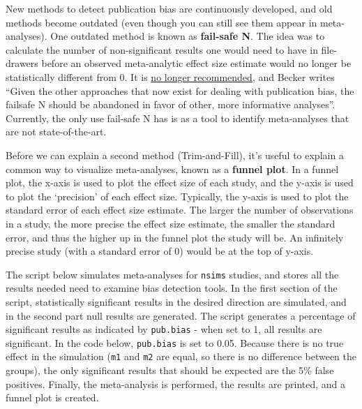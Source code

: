 \documentclass[
  oneside]{book}
\begin{document}
New methods to detect publication bias are continuously developed, and old methods become outdated (even though you can still see them appear in meta-analyses). One outdated method is known as \textbf{fail-safe N}. The idea was to calculate the number of non-significant results one would need to have in file-drawers before an observed meta-analytic effect size estimate would no longer be statistically different from 0. It is \href{https://handbook-5-1.cochrane.org/chapter_10/10_4_4_3_fail_safe_n.htm}{no longer recommended}, and Becker \citeyearpar{becker_failsafe_2005} writes ``Given the other approaches that now exist for dealing with publication bias, the failsafe N should be abandoned in favor of other, more informative analyses''. Currently, the only use fail-safe N has is as a tool to identify meta-analyses that are not state-of-the-art.

Before we can explain a second method (Trim-and-Fill), it's useful to explain a common way to visualize meta-analyses, known as a \textbf{funnel plot}. In a funnel plot, the x-axis is used to plot the effect size of each study, and the y-axis is used to plot the `precision' of each effect size. Typically, the y-axis is used to plot the standard error of each effect size estimate. The larger the number of observations in a study, the more precise the effect size estimate, the smaller the standard error, and thus the higher up in the funnel plot the study will be. An infinitely precise study (with a standard error of 0) would be at the top of y-axis.

The script below simulates meta-analyses for \texttt{nsims} studies, and stores all the results needed need to examine bias detection tools. In the first section of the script, statistically significant results in the desired direction are simulated, and in the second part null results are generated. The script generates a percentage of significant results as indicated by \texttt{pub.bias} - when set to 1, all results are significant. In the code below, \texttt{pub.bias} is set to 0.05. Because there is no true effect in the simulation (\texttt{m1} and \texttt{m2} are equal, so there is no difference between the groups), the only significant results that should be expected are the 5\% false positives. Finally, the meta-analysis is performed, the results are printed, and a funnel plot is created.
\end{document}
